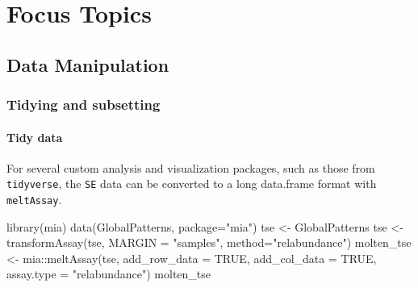 \documentclass[
]{book}
\newenvironment{Shaded}{\begin{snugshade}}{\end{snugshade}}
\newcommand{\AttributeTok}[1]{\textcolor[rgb]{0.77,0.63,0.00}{#1}}
\newcommand{\ConstantTok}[1]{\textcolor[rgb]{0.00,0.00,0.00}{#1}}
\newcommand{\FunctionTok}[1]{\textcolor[rgb]{0.00,0.00,0.00}{#1}}
\newcommand{\NormalTok}[1]{#1}
\newcommand{\OtherTok}[1]{\textcolor[rgb]{0.56,0.35,0.01}{#1}}
\newcommand{\SpecialCharTok}[1]{\textcolor[rgb]{0.00,0.00,0.00}{#1}}
\newcommand{\StringTok}[1]{\textcolor[rgb]{0.31,0.60,0.02}{#1}}
\begin{document}
\hypertarget{part-focus-topics}{%
\part{Focus Topics}\label{part-focus-topics}}

\hypertarget{datamanipulation}{%
\chapter{Data Manipulation}\label{datamanipulation}}

\hypertarget{tidying-and-subsetting}{%
\section{Tidying and subsetting}\label{tidying-and-subsetting}}

\hypertarget{tidy-data}{%
\subsection{Tidy data}\label{tidy-data}}

For several custom analysis and visualization packages, such as those from
\texttt{tidyverse}, the \texttt{SE} data can be converted to a long data.frame format with
\texttt{meltAssay}.

\begin{Shaded}
\begin{Highlighting}[]
\FunctionTok{library}\NormalTok{(mia)}
\FunctionTok{data}\NormalTok{(GlobalPatterns, }\AttributeTok{package=}\StringTok{"mia"}\NormalTok{)}
\NormalTok{tse }\OtherTok{\textless{}{-}}\NormalTok{ GlobalPatterns}
\NormalTok{tse }\OtherTok{\textless{}{-}} \FunctionTok{transformAssay}\NormalTok{(tse, }\AttributeTok{MARGIN =} \StringTok{"samples"}\NormalTok{, }\AttributeTok{method=}\StringTok{"relabundance"}\NormalTok{)}
\NormalTok{molten\_tse }\OtherTok{\textless{}{-}}\NormalTok{ mia}\SpecialCharTok{::}\FunctionTok{meltAssay}\NormalTok{(tse,}
                        \AttributeTok{add\_row\_data =} \ConstantTok{TRUE}\NormalTok{,}
                        \AttributeTok{add\_col\_data =} \ConstantTok{TRUE}\NormalTok{,}
                        \AttributeTok{assay.type =} \StringTok{"relabundance"}\NormalTok{)}
\NormalTok{molten\_tse}
\end{Highlighting}
\end{Shaded}
\end{document}
